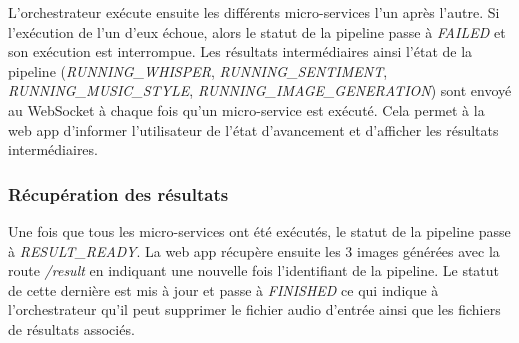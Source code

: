 L'orchestrateur exécute ensuite les différents micro-services l'un après l'autre. Si l'exécution de l'un d'eux échoue, alors le statut de la pipeline passe à \textit{FAILED} et son exécution est interrompue. Les résultats intermédiaires ainsi l'état de la pipeline (\textit{RUNNING\_WHISPER}, \textit{RUNNING\_SENTIMENT}, \textit{RUNNING\_MUSIC\_STYLE}, \textit{RUNNING\_IMAGE\_GENERATION}) sont envoyé au WebSocket à chaque fois qu'un micro-service est exécuté. Cela permet à la web app d'informer l'utilisateur de l'état d'avancement et d'afficher les résultats intermédiaires.

\subsubsection*{Récupération des résultats}
Une fois que tous les micro-services ont été exécutés, le statut de la pipeline passe à \textit{RESULT\_READY}. 
La web app récupère ensuite les 3 images générées avec la route \textit{/result} en indiquant une nouvelle fois l'identifiant de la pipeline. Le statut de cette dernière est mis à jour et passe à \textit{FINISHED} ce qui indique à l'orchestrateur qu'il peut supprimer le fichier audio d'entrée ainsi que les fichiers de résultats associés.


